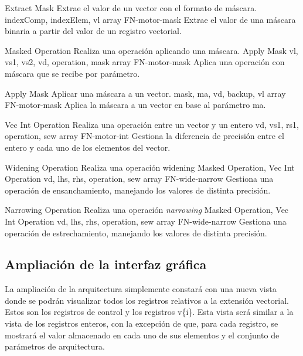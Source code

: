 \begin{component}{Extract Mask} %
{Extrae el valor de un vector con el formato de máscara.}
{\NA}
{indexComp, indexElem, vl}
{array}
{FN-motor-mask}
Extrae el valor de una máscara binaria a partir del valor de un registro vectorial.
\end{component}

\begin{component}{Masked Operation} %
{Realiza una operación aplicando una máscara.}
{Apply Mask}
{vl, vs1, vs2, vd, operation, mask}
{array}
{FN-motor-mask}
Aplica una operación con máscara que se recibe por parámetro.
\end{component}

\begin{component}{Apply Mask} %
{Aplicar una máscara a un vector.}
{\NA}
{mask, ma, vd, backup, vl}
{array}
{FN-motor-mask}
Aplica la máscara a un vector en base al parámetro ma.
\end{component}

\begin{component}{Vec Int Operation} %
{Realiza una operación entre un vector y un entero}
{\NA}
{vd, vs1, rs1, operation, sew}
{array}
{FN-motor-int}
Gestiona la diferencia de precisión entre el entero y cada uno de los elementos del vector.
\end{component}


\begin{component}{Widening Operation} %
{Realiza una operación widening}
{Masked Operation, Vec Int Operation}
{vd, lhs, rhs, operation, sew}
{array}
{FN-wide-narrow}
Gestiona una operación de ensanchamiento, manejando los valores de distinta precisión.
\end{component}

\begin{component}{Narrowing Operation} %
{Realiza una operación \textit{narrowing}}
{Masked Operation, Vec Int Operation}
{vd, lhs, rhs, operation, sew}
{array}
{FN-wide-narrow}
Gestiona una operación de estrechamiento, manejando los valores de distinta precisión.
\end{component}
\FloatBarrier

\subsection{Ampliación de la interfaz gráfica}

La ampliación de la arquitectura simplemente constará con una nueva vista donde
se podrán visualizar todos los registros relativos a la extensión vectorial.
Estos son los registros de control y los registros v\{i\}. Esta vista será
similar a la vista de los registros enteros, con la excepción de que, para cada
registro, se mostrará el valor almacenado en cada uno de sus elementos y el
conjunto de parámetros de arquitectura.

